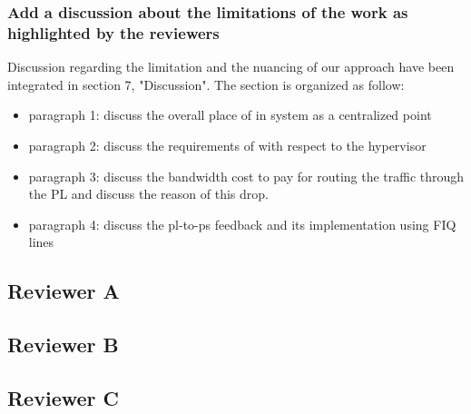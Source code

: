         \subsubsection{Add a discussion about the limitations of the work as highlighted by the reviewers}
            Discussion regarding the limitation and the nuancing of our approach have been integrated in section 7, "Discussion".
            The section is organized as follow:
            \begin{itemize}
                \item paragraph 1: discuss the overall place of \schim in system as a centralized point
                \item paragraph 2: discuss the requirements of \schim with respect to the hypervisor
                \item paragraph 3: discuss the bandwidth cost to pay for routing the traffic through the PL and discuss the reason of this drop.
                \item paragraph 4: discuss the pl-to-ps feedback and its implementation using FIQ lines
            \end{itemize}

    \subsection{Reviewer A}

    \subsection{Reviewer B}

    \subsection{Reviewer C}
